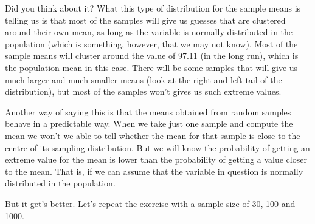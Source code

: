 \documentclass[]{book}
\theoremstyle{definition}
\theoremstyle{definition}
\theoremstyle{definition}
\theoremstyle{remark}
\begin{document}
Did you think about it? What this type of distribution for the sample
means is telling us is that most of the samples will give us guesses
that are clustered around their own mean, as long as the variable is
normally distributed in the population (which is something, however,
that we may not know). Most of the sample means will cluster around the
value of 97.11 (in the long run), which is the population mean in this
case. There will be some samples that will give us much larger and much
smaller means (look at the right and left tail of the distribution), but
most of the samples won't gives us such extreme values.

Another way of saying this is that the means obtained from random
samples behave in a predictable way. When we take just one sample and
compute the mean we won't we able to tell whether the mean for that
sample is close to the centre of its sampling distribution. But we will
know the probability of getting an extreme value for the mean is lower
than the probability of getting a value closer to the mean. That is, if
we can assume that the variable in question is normally distributed in
the population.

But it get's better. Let's repeat the exercise with a sample size of 30,
100 and 1000.
\end{document}
